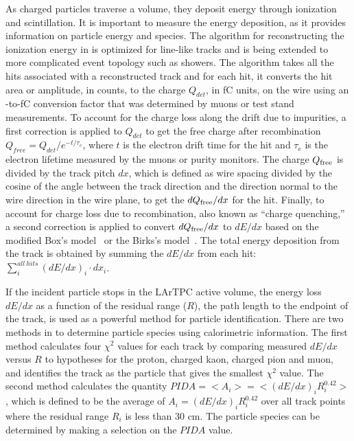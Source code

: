 As charged particles traverse a \lar volume, they deposit energy through ionization and scintillation. It is important to measure the energy deposition, as it provides information on particle energy and species. The algorithm for reconstructing the ionization energy in  is optimized for line-like tracks and is being extended to more complicated event topology such as showers. The algorithm takes all the hits associated with a reconstructed track and for %
each hit, it converts the hit area or amplitude, in  counts, %
to the charge $Q_{det}$, in fC units,  on the wire using an -to-fC conversion factor that was determined by muons or test stand measurements. To account for the charge loss along the drift due to impurities, a first correction is applied to $Q_{det}$ to get the free charge after recombination $Q_{free} = Q_{det}/e^{-t/\tau_{e}}$, where $t$ is the electron drift time for the hit and $\tau_{e}$ is the electron lifetime measured by the muons or purity monitors. The charge $Q_{\rm{free}}$ is divided by the track pitch $dx$, which is defined as wire spacing divided by the cosine of the angle between the track direction and the direction normal to the wire direction in the wire plane, to get the $dQ_{\rm{free}}/dx$ for the hit. Finally, to account for charge loss due to recombination, also known as ``charge quenching,'' a second correction is applied to convert $dQ_{\rm{free}}/dx$ to $dE/dx$ based on the modified Box's model~ \cite{Acciarri:2013met} or the Birks's model~\cite{Amoruso:2004dy}. The total energy deposition from the track is obtained by summing the $dE/dx$ from each hit: $\sum\limits_{i}^{all\ hits}(dE/dx)_{i}\cdot dx_{i}$.

If the incident particle stops in the LArTPC active volume, the energy loss $dE/dx$ as a function of the residual range ($R$), the path length to the endpoint of the track, is used as a powerful method for particle identification. There are two methods in  to determine particle species using calorimetric information. The first method calculates four $\chi^{2}$ values for each track by comparing measured $dE/dx$ %
versus $R$ to hypotheses for the proton, charged kaon, charged pion and muon, and identifies the track as the particle that gives the smallest $\chi^{2}$ value. The second method calculates the quantity $PIDA = <A_{i}> = <(dE/dx)_{i}R_{i}^{0.42}>$ \cite{Acciarri:2013met}, which is defined to be the average of $A_{i} = (dE/dx)_{i}R_{i}^{0.42}$ over all track points where the residual range $R_{i}$ is less than 30 cm. The particle species can be determined by making a selection on the $PIDA$ value. 

